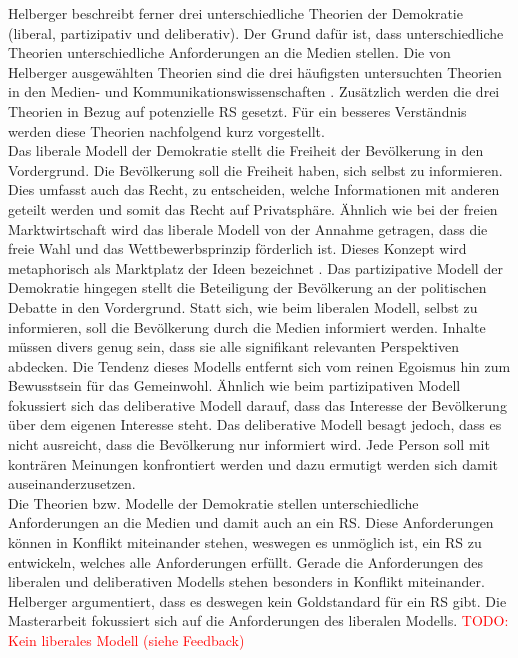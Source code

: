Helberger beschreibt ferner drei unterschiedliche Theorien der Demokratie (liberal, partizipativ und deliberativ).
Der Grund dafür ist, dass unterschiedliche Theorien unterschiedliche Anforderungen an die Medien stellen.
Die von Helberger ausgewählten Theorien sind die drei häufigsten untersuchten Theorien in den Medien- und Kommunikationswissenschaften \cite{democratic-theories}.
Zusätzlich werden die drei Theorien in Bezug auf potenzielle \ac{RS} gesetzt.
Für ein besseres Verständnis werden diese Theorien nachfolgend kurz vorgestellt.\\

Das liberale Modell der Demokratie stellt die Freiheit der Bevölkerung in den Vordergrund.
Die Bevölkerung soll die Freiheit haben, sich selbst zu informieren.
Dies umfasst auch das Recht, zu entscheiden, welche Informationen mit anderen geteilt werden und somit das Recht auf Privatsphäre.
Ähnlich wie bei der freien Marktwirtschaft wird das liberale Modell von der Annahme getragen, dass die freie Wahl und das Wettbewerbsprinzip förderlich ist.
Dieses Konzept wird metaphorisch als \glqq Marktplatz der Ideen\grqq{} bezeichnet \cite{marketplace-ideas}.
Das partizipative Modell der Demokratie hingegen stellt die Beteiligung der Bevölkerung an der politischen Debatte in den Vordergrund.
Statt sich, wie beim liberalen Modell, selbst zu informieren, soll die Bevölkerung durch die Medien informiert werden.
Inhalte müssen divers genug sein, dass sie alle signifikant relevanten Perspektiven abdecken.
Die Tendenz dieses Modells entfernt sich vom reinen Egoismus hin zum Bewusstsein für das Gemeinwohl.
Ähnlich wie beim partizipativen Modell fokussiert sich das deliberative Modell darauf, dass das Interesse der Bevölkerung über dem eigenen Interesse steht.
Das deliberative Modell besagt jedoch, dass es nicht ausreicht, dass die Bevölkerung nur informiert wird.
Jede Person soll mit konträren Meinungen konfrontiert werden und dazu ermutigt werden sich damit auseinanderzusetzen. \\

Die Theorien bzw. Modelle der Demokratie stellen unterschiedliche Anforderungen an die Medien und damit auch an ein \ac{RS}.
Diese Anforderungen können in Konflikt miteinander stehen, weswegen es unmöglich ist, ein \ac{RS} zu entwickeln, welches alle Anforderungen erfüllt.
Gerade die Anforderungen des liberalen und deliberativen Modells stehen besonders in Konflikt miteinander.
Helberger argumentiert, dass es deswegen kein Goldstandard für ein \ac{RS} gibt.
Die Masterarbeit fokussiert sich auf die Anforderungen des liberalen Modells. \textcolor{red}{TODO: Kein liberales Modell (siehe Feedback)}

